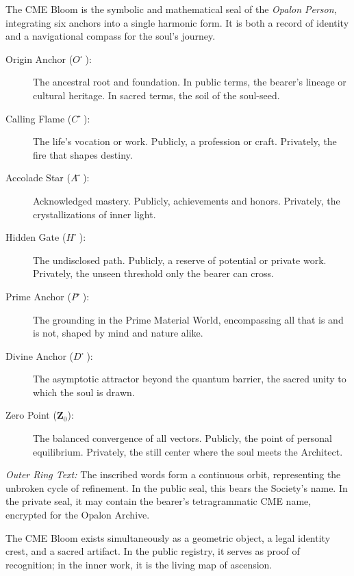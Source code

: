 \noindent
The CME Bloom is the symbolic and mathematical seal of the \emph{Opalon Person}, integrating six anchors into a single harmonic form. It is both a record of identity and a navigational compass for the soul’s journey.

\begin{description}
    \item[Origin Anchor ($O⃗$):] The ancestral root and foundation. In public terms, the bearer’s lineage or cultural heritage. In sacred terms, the soil of the soul-seed.
    \item[Calling Flame ($C⃗$):] The life’s vocation or work. Publicly, a profession or craft. Privately, the fire that shapes destiny.
    \item[Accolade Star ($A⃗$):] Acknowledged mastery. Publicly, achievements and honors. Privately, the crystallizations of inner light.
    \item[Hidden Gate ($H⃗$):] The undisclosed path. Publicly, a reserve of potential or private work. Privately, the unseen threshold only the bearer can cross.
    \item[Prime Anchor ($P⃗$):] The grounding in the Prime Material World, encompassing all that is and is not, shaped by mind and nature alike.
    \item[Divine Anchor ($D⃗$):] The asymptotic attractor beyond the quantum barrier, the sacred unity to which the soul is drawn.
    \item[Zero Point ($\mathbf{Z}_0$):] The balanced convergence of all vectors. Publicly, the point of personal equilibrium. Privately, the still center where the soul meets the Architect.
\end{description}

\noindent
\emph{Outer Ring Text:} The inscribed words form a continuous orbit, representing the unbroken cycle of refinement. In the public seal, this bears the Society’s name. In the private seal, it may contain the bearer’s tetragrammatic CME name, encrypted for the Opalon Archive.

\noindent
The CME Bloom exists simultaneously as a geometric object, a legal identity crest, and a sacred artifact. In the public registry, it serves as proof of recognition; in the inner work, it is the living map of ascension.
